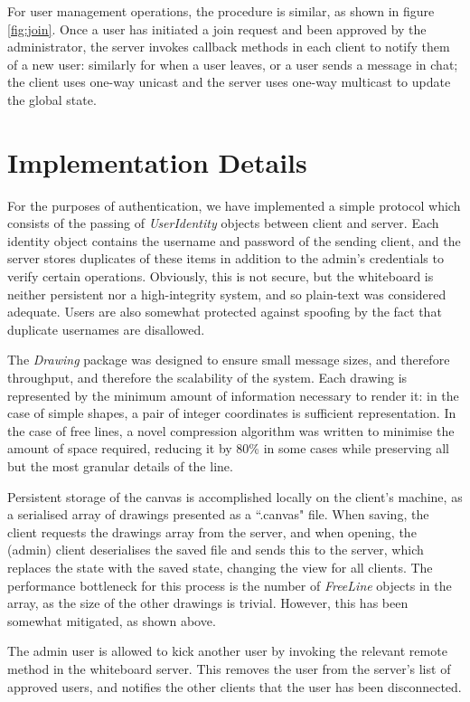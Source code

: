 \documentclass[12pt,a4paper]{article}
\begin{document}
For user management operations, the procedure is similar, as shown in figure \ref{fig:join}. Once a user has initiated a join request and been approved by the administrator, the server invokes callback methods in each client to notify them of a new user: similarly for when a user leaves, or a user sends a message in chat; the client uses one-way unicast and the server uses one-way multicast to update the global state. 


\section{Implementation Details}

For the purposes of authentication, we have implemented a simple protocol which consists of the passing of \textit{UserIdentity} objects between client and server. Each identity object contains the username and password of the sending client, and the server stores duplicates of these items in addition to the admin's credentials to verify certain operations. Obviously, this is not secure, but the whiteboard is neither persistent nor a high-integrity system, and so plain-text was considered adequate. Users are also somewhat protected against spoofing by the fact that duplicate usernames are disallowed.

The \textit{Drawing} package was designed to ensure small message sizes, and therefore throughput, and therefore the scalability of the system. Each drawing is represented by the minimum amount of information necessary to render it: in the case of simple shapes, a pair of integer coordinates is sufficient representation. In the case of free lines, a novel compression algorithm was written to minimise the amount of space required, reducing it by 80\% in some cases while preserving all but the most granular details of the line. 

Persistent storage of the canvas is accomplished locally on the client's machine, as a serialised array of drawings presented as a ``.canvas" file. When saving, the client requests the drawings array from the server, and when opening, the (admin) client deserialises the saved file and sends this to the server, which replaces the state with the saved state, changing the view for all clients. The performance bottleneck for this process is the number of \textit{FreeLine} objects in the array, as the size of the other drawings is trivial. However, this has been somewhat mitigated, as shown above.

The admin user is allowed to kick another user by invoking the relevant remote method in the whiteboard server. This removes the user from the server's list of approved users, and notifies the other clients that the user has been disconnected.
\end{document}
